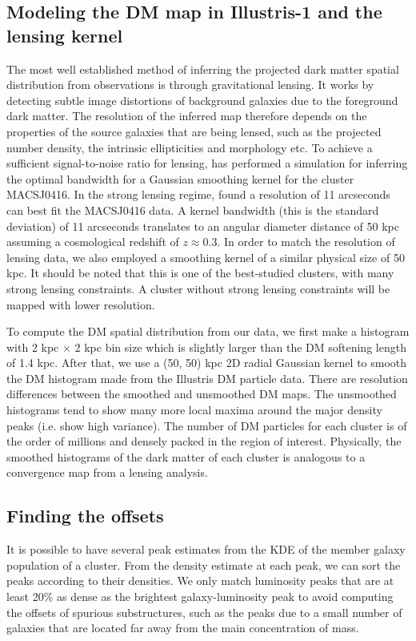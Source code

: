 \subsection{Modeling the DM map in Illustris-1 and the lensing kernel}
The most well established method of inferring the projected dark matter spatial 
distribution from observations is through gravitational lensing.
It works by detecting subtle image distortions of background galaxies due to
the foreground dark matter. The resolution of the inferred map therefore 
depends on the properties of the source galaxies that are being lensed, 
such as the projected number density, the intrinsic ellipticities and morphology etc.
To achieve a sufficient signal-to-noise ratio for lensing, 
\cite{Hoag2016} has performed a simulation for inferring the optimal bandwidth
for a Gaussian smoothing kernel for the cluster MACSJ0416. 
In the strong lensing regime, \cite{Hoag2016} found a resolution of 11 arcseconds
can best fit the MACSJ0416 data. A kernel bandwidth (this is the standard deviation) 
of 11 arcseconds translates to an angular diameter distance of 50 
kpc assuming a cosmological redshift of $z \approx 0.3$. 
In order to match the resolution of lensing data,
we also employed a smoothing kernel of a similar physical size of 50 kpc.  
It should be noted that this is one of the best-studied clusters, 
with many strong lensing constraints. 
A cluster without strong lensing constraints will be mapped with 
lower resolution.

To compute the DM spatial distribution from our data, we first make a histogram with 2 kpc
$\times$ 2 kpc bin size which is slightly larger than the DM softening length of 1.4 kpc. 
After that, we use a (50, 50) kpc 2D radial Gaussian kernel 
to smooth the DM histogram made from the Illustris DM
particle data. 
There are resolution differences between the smoothed and unsmoothed DM
maps. The unsmoothed histograms tend to show many more local maxima around the major
density peaks (i.e. show high variance). 
The number of DM particles for each cluster is of 
the order of millions and densely packed in the region of
interest. 
Physically, the smoothed histograms of the dark matter of each cluster 
is analogous to a convergence map from a lensing analysis. 


\subsection{Finding the offsets} \label{subsec:offsets}
It is possible to have several peak estimates from the KDE of the member galaxy 
population of a cluster. 
From the density estimate at each peak, we can sort 
the peaks according to their densities. We only match luminosity 
peaks that are at 
least 20\% as dense as the brightest galaxy-luminosity peak to avoid 
computing the offsets of spurious substructures, such as the peaks due to 
a small number of galaxies that are located far away from the main concentration of mass.

